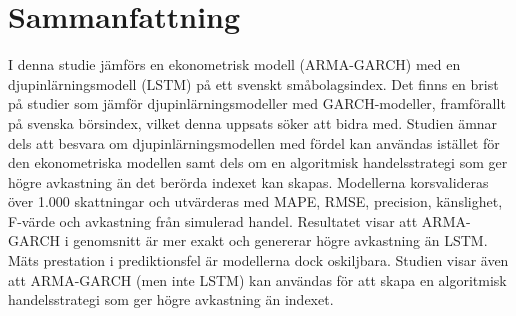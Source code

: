 \documentclass[11pt]{article}
\numberwithin{equation}{section}
\numberwithin{table}{section}
\numberwithin{figure}{section}
\begin{document}
\section*{Sammanfattning}
I denna studie jämförs en ekonometrisk modell (ARMA-GARCH) med en djupinlärningsmodell (LSTM) på ett svenskt småbolagsindex. Det finns en brist på studier som jämför djupinlärningsmodeller med GARCH-modeller, framförallt på svenska börsindex, vilket denna uppsats söker att bidra med. Studien ämnar dels att besvara om djupinlärningsmodellen med fördel kan användas istället för den ekonometriska modellen samt dels om en algoritmisk handelsstrategi som ger högre avkastning än det berörda indexet kan skapas. Modellerna korsvalideras över 1.000 skattningar och utvärderas med MAPE, RMSE, precision, känslighet, F-värde och avkastning från simulerad handel. Resultatet visar att ARMA-GARCH i genomsnitt är mer exakt och genererar högre avkastning än LSTM. Mäts prestation i prediktionsfel är modellerna dock oskiljbara. Studien visar även att ARMA-GARCH (men inte LSTM) kan användas för att skapa en algoritmisk handelsstrategi som ger högre avkastning än indexet.


\newpage
\thispagestyle{empty}
{\fontsize{11pt}{10.5pt}\selectfont %
    \tableofcontents
}
\thispagestyle{empty}
\newpage

\newpage 
\thispagestyle{empty}
\end{document}

